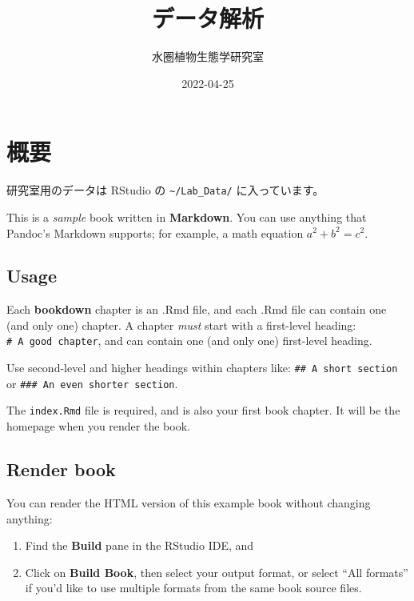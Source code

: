 \documentclass[
]{book}
\title{データ解析}
\author{水圏植物生態学研究室}
\date{2022-04-25}
\theoremstyle{definition}
\theoremstyle{definition}
\theoremstyle{definition}
\theoremstyle{definition}
\theoremstyle{remark}
\begin{document}
\maketitle

{
\setcounter{tocdepth}{1}
\tableofcontents
}
\hypertarget{ux6982ux8981}{%
\chapter{概要}\label{ux6982ux8981}}

研究室用のデータは RStudio の \texttt{\textasciitilde{}/Lab\_Data/} に入っています。

This is a \emph{sample} book written in \textbf{Markdown}. You can use anything that Pandoc's Markdown supports; for example, a math equation \(a^2 + b^2 = c^2\).

\hypertarget{usage}{%
\section{Usage}\label{usage}}

Each \textbf{bookdown} chapter is an .Rmd file, and each .Rmd file can contain one (and only one) chapter. A chapter \emph{must} start with a first-level heading: \texttt{\#\ A\ good\ chapter}, and can contain one (and only one) first-level heading.

Use second-level and higher headings within chapters like: \texttt{\#\#\ A\ short\ section} or \texttt{\#\#\#\ An\ even\ shorter\ section}.

The \texttt{index.Rmd} file is required, and is also your first book chapter. It will be the homepage when you render the book.

\hypertarget{render-book}{%
\section{Render book}\label{render-book}}

You can render the HTML version of this example book without changing anything:

\begin{enumerate}
\def\labelenumi{\arabic{enumi}.}
\item
  Find the \textbf{Build} pane in the RStudio IDE, and
\item
  Click on \textbf{Build Book}, then select your output format, or select ``All formats'' if you'd like to use multiple formats from the same book source files.
\end{enumerate}
\end{document}
